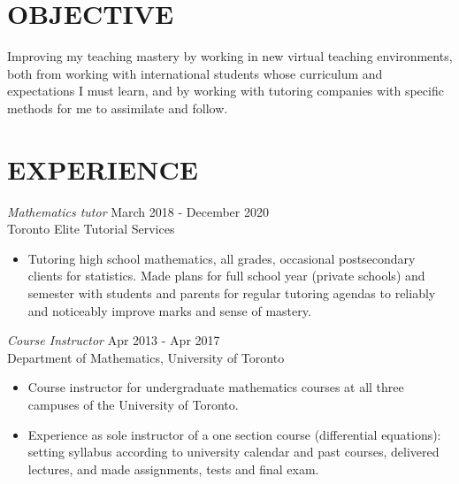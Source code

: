\documentclass[margin, 10pt]{res} %
\begin{document}
\begin{resume}

 
\section{OBJECTIVE}  

Improving my teaching mastery by working in new virtual teaching environments, both from working with international students whose curriculum and expectations I must learn, and by working with tutoring companies with specific methods for me to assimilate and follow.


 
\section{EXPERIENCE}

{\sl Mathematics tutor} \hfill March 2018 - December 2020 \\
Toronto Elite Tutorial Services

\begin{itemize} \itemsep -2pt %
\item Tutoring high school mathematics, all grades, occasional postsecondary clients for statistics. Made plans for full school year (private schools) and semester with students and parents for regular tutoring agendas to reliably and noticeably improve marks and sense of mastery. 
\end{itemize}

{\sl Course Instructor} \hfill Apr 2013 - Apr 2017 \\
Department of Mathematics, University of Toronto

\begin{itemize} \itemsep -2pt %
\item Course instructor for undergraduate mathematics courses at all three campuses of the University of Toronto.

\item Experience as sole instructor of a one section course (differential equations): setting syllabus according to university calendar and past courses, delivered lectures, and made assignments, tests and final exam.


\end{itemize}
\end{resume}
\end{document}
